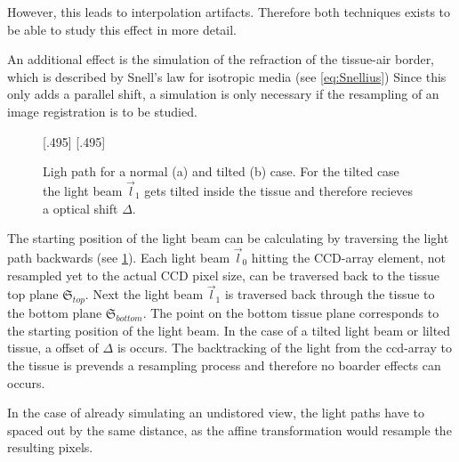 However, this leads to interpolation artifacts.
Therefore both techniques exists to be able to study this effect in more detail.
\par
%
An additional effect is the simulation of the refraction of the tissue-air border, which is described by Snell's law for isotropic media (see \cref{eq:Snellius})
Since this only adds a parallel shift, a simulation is only necessary if the resampling of an image registration is to be studied.
\par
%
\begin{figure}[!t]
\setlength{\tikzwidth}{0.42\textwidth}
[.495\textwidth]{
\def\tilt{0}
\def\nindex{2.25}
}\hfill
{}[.495\textwidth]{
}
\caption[Light path]{Ligh path for a normal (a) and tilted (b) case. For the tilted case the light beam $\vec{l}_1$ gets tilted inside the tissue and therefore recieves a optical shift $\Delta$.}
\label{fig:tilted_side_view}
\end{figure}
%
The starting position of the light beam can be calculating by traversing the light path backwards (see \cref{fig:tilted_side_view}).
Each light beam $\vec{l}_0$ hitting the \ac{CCD}-array element, not resampled yet to the actual \ac{CCD} pixel size, can be traversed back to the tissue top plane $\mathfrak{S}_{top}$.
Next the light beam $\vec{l}_1$ is traversed back through the tissue to the bottom plane $\mathfrak{S}_{bottom}$.
The point on the bottom tissue plane corresponds to the starting position of the light beam.
In the case of a tilted light beam or lilted tissue, a offset of $\Delta$ is occurs.
The backtracking of the light from the ccd-array to the tissue is prevends a  resampling process and therefore no boarder effects can occurs.
\par
%
In the case of already simulating an undistored view, the light paths have to spaced out by the same distance, as the affine transformation would resample the resulting pixels.
%
\begin{lstfloat}[!p]
	
	\caption{Pseudocode simulation }
	\label{alg:simulation}
\end{lstfloat}
%
